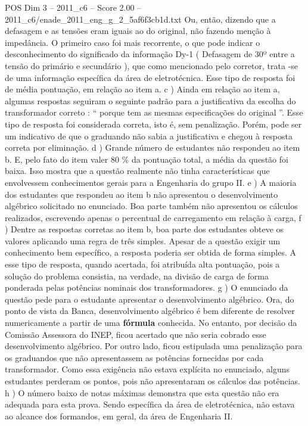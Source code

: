 \begin{textsample}{POS Dim 3 – 2011\_c6 – Score 2.00 – 2011\_c6/enade\_2011\_eng\_g\_2\_5af6f3cb1d.txt}
Ou, então, dizendo que a defasagem e as tensões eram iguais ao do original, não fazendo menção à impedância.
O primeiro caso foi mais recorrente, o que pode indicar o desconhecimento do significado da informação Dy-1 ( Defasagem de 30º entre a tensão do primário e secundário ), que como mencionado pelo corretor, trata -se de uma informação específica da área de eletrotécnica.
Esse tipo de resposta foi de média pontuação, em relação ao item a. c ) Ainda em relação ao item a, algumas respostas seguiram o seguinte padrão para a justificativa da escolha do transformador correto : “ porque tem as mesmas especificações do original ”.
Esse tipo de resposta foi considerada correta, isto é, sem penalização.
Porém, pode ser um indicativo de que o graduando não sabia a justificativa e chegou à resposta correta por eliminação. d ) Grande número de estudantes não respondeu ao item b.
E, pelo fato do item valer 80 \% da pontuação total, a média da questão foi baixa.
Isso mostra que a questão realmente não tinha características que envolvessem conhecimentos gerais para a Engenharia do grupo II. e ) A maioria dos estudantes que respondeu ao item b não apresentou o desenvolvimento algébrico solicitado no enunciado.
Boa parte também não apresentou os cálculos realizados, escrevendo apenas o percentual de carregamento em relação à carga, f ) Dentre as respostas corretas ao item b, boa parte dos estudantes obteve os valores aplicando uma regra de três simples.
Apesar de a questão exigir um conhecimento bem específico, a resposta poderia ser obtida de forma simples.
A esse tipo de resposta, quando acertada, foi atribuída alta pontuação, pois a solução do problema consistia, na verdade, na divisão de carga de forma ponderada pelas potências nominais dos transformadores. g ) O enunciado da questão pede para o estudante apresentar o desenvolvimento algébrico.
Ora, do ponto de vista da Banca, desenvolvimento algébrico é bem diferente de resolver numericamente a partir de uma \textbf{fórmula} conhecida.
No entanto, por decisão da Comissão Assessora do INEP, ficou acertado que não seria cobrado esse desenvolvimento algébrico.
Por outro lado, ficou estipulada uma penalização para os graduandos que não apresentassem as potências fornecidas por cada transformador.
Como essa exigência não estava explícita no enunciado, alguns estudantes perderam os pontos, pois não apresentaram os cálculos das potências. h ) O número baixo de notas máximas demonstra que esta questão não era adequada para esta prova.
Sendo específica da área de eletrotécnica, não estava ao alcance dos formandos, em geral, da área de Engenharia II.

\end{textsample}

